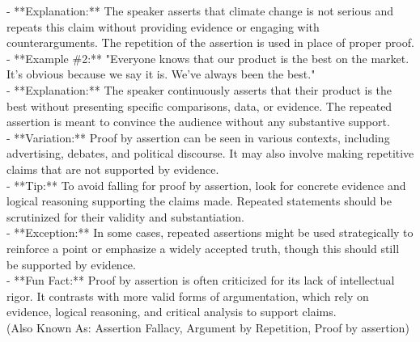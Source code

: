 \documentclass[a4paper,12pt,single,pdftex]{scrbook}
\begin{document}
{    
      - **Explanation:** The speaker asserts that climate change is not serious and repeats this claim without providing evidence or engaging with counterarguments. The repetition of the assertion is used in place of proper proof.
    \\

    
      - **Example \#2:** "Everyone knows that our product is the best on the market. It’s obvious because we say it is. We’ve always been the best."
    \\

    
      - **Explanation:** The speaker continuously asserts that their product is the best without presenting specific comparisons, data, or evidence. The repeated assertion is meant to convince the audience without any substantive support.
    \\

    
      - **Variation:** Proof by assertion can be seen in various contexts, including advertising, debates, and political discourse. It may also involve making repetitive claims that are not supported by evidence.
    \\

    
      - **Tip:** To avoid falling for proof by assertion, look for concrete evidence and logical reasoning supporting the claims made. Repeated statements should be scrutinized for their validity and substantiation.
    \\

    
      - **Exception:** In some cases, repeated assertions might be used strategically to reinforce a point or emphasize a widely accepted truth, though this should still be supported by evidence.
    \\

    
      - **Fun Fact:** Proof by assertion is often criticized for its lack of intellectual rigor. It contrasts with more valid forms of argumentation, which rely on evidence, logical reasoning, and critical analysis to support claims.
    \\

  
    
      (Also Known As: Assertion Fallacy, Argument by Repetition, Proof by assertion)
    \\

  }
\end{document}
